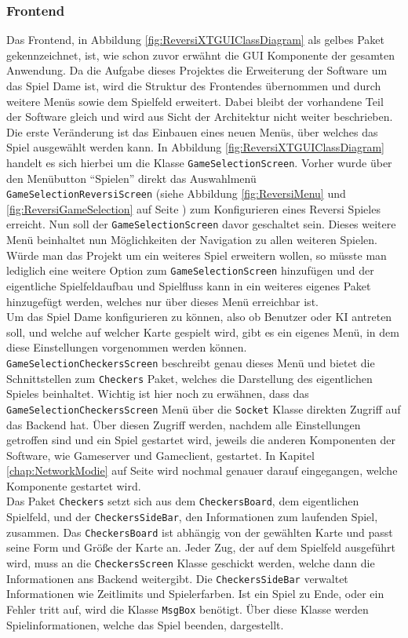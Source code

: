 \documentclass[12pt,a4paper,bibliography=totocnumbered,listof=totocnumbered]{article}
\begin{document}
\subsubsection{Frontend}
Das Frontend, in Abbildung \ref{fig:ReversiXTGUIClassDiagram} als gelbes Paket gekennzeichnet, ist, wie schon zuvor erwähnt die
\ac{GUI} Komponente der gesamten Anwendung. Da die Aufgabe dieses Projektes die Erweiterung der Software um das Spiel Dame ist, 
wird die Struktur des Frontendes übernommen und durch weitere Menüs sowie dem Spielfeld erweitert. Dabei bleibt der vorhandene Teil der Software gleich 
und wird aus Sicht der Architektur nicht weiter beschrieben. 
\\
Die erste Veränderung ist das Einbauen eines neuen Menüs, über welches das Spiel ausgewählt werden kann. In Abbildung \ref{fig:ReversiXTGUIClassDiagram} 
handelt es sich hierbei um die Klasse \texttt{GameSelectionScreen}. Vorher wurde über den Menübutton ``Spielen'' direkt das Auswahlmenü \texttt{GameSelectionReversiScreen}
(siehe Abbildung \ref{fig:ReversiMenu} und \ref{fig:ReversiGameSelection} auf Seite \pageref{fig:ReversiMenu}) zum Konfigurieren eines Reversi Spieles erreicht. 
Nun soll der \texttt{GameSelectionScreen} davor geschaltet sein. Dieses weitere Menü beinhaltet nun Möglichkeiten der Navigation zu allen weiteren Spielen.
Würde man das Projekt um ein weiteres Spiel erweitern wollen, so müsste man lediglich eine weitere Option zum \texttt{GameSelectionScreen} hinzufügen 
und der eigentliche Spielfeldaufbau und Spielfluss kann in ein weiteres eigenes Paket hinzugefügt werden, welches nur über dieses Menü erreichbar ist.
\\
Um das Spiel Dame konfigurieren zu können, also ob Benutzer oder \ac{KI} antreten soll, und welche auf welcher Karte gespielt wird, gibt es ein eigenes Menü, 
in dem diese Einstellungen vorgenommen werden können. \texttt{GameSelectionCheckersScreen} beschreibt genau dieses Menü und bietet die Schnittstellen 
zum \texttt{Checkers} Paket, welches die Darstellung des eigentlichen Spieles beinhaltet. Wichtig ist hier noch zu erwähnen, dass das \texttt{GameSelectionCheckersScreen}
Menü über die \texttt{Socket} Klasse direkten Zugriff auf das Backend hat. Über diesen Zugriff werden, nachdem alle Einstellungen getroffen sind und ein Spiel
gestartet wird, jeweils die anderen Komponenten der Software, wie Gameserver und Gameclient, gestartet. In Kapitel \ref{chap:NetworkModie} auf Seite \pageref{chap:NetworkModie} 
wird nochmal genauer darauf eingegangen, welche Komponente gestartet wird.
\\
Das Paket \texttt{Checkers} setzt sich aus dem \texttt{CheckersBoard}, dem eigentlichen Spielfeld, und der \texttt{CheckersSideBar}, den Informationen zum laufenden Spiel, zusammen. 
Das \texttt{CheckersBoard} ist abhängig von der gewählten Karte und passt seine Form und Größe der Karte an. Jeder Zug, der auf dem Spielfeld ausgeführt wird, muss an 
die \texttt{CheckersScreen} Klasse geschickt werden, welche dann die Informationen ans Backend weitergibt.
Die \texttt{CheckersSideBar} verwaltet Informationen wie Zeitlimits und Spielerfarben. 
Ist ein Spiel zu Ende, oder ein Fehler tritt auf, wird die Klasse \texttt{MsgBox} benötigt. Über diese Klasse werden Spielinformationen, welche das Spiel beenden, 
dargestellt.
\end{document}
